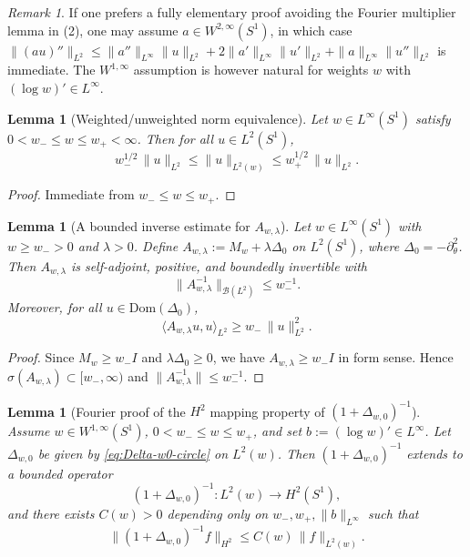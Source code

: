 \documentclass{amsart}
\numberwithin{equation}{section}
\newtheorem{lemma}[theorem]{Lemma}
\theoremstyle{definition}
\theoremstyle{remark}
\newtheorem{remark}[theorem]{Remark}
\begin{document}
\begin{remark}
If one prefers a fully elementary proof avoiding the Fourier multiplier lemma in (2),
one may assume $a\in W^{2,\infty}(S^1)$, in which case
$\|(au)''\|_{L^2}\le \|a''\|_{L^\infty}\|u\|_{L^2}+2\|a'\|_{L^\infty}\|u'\|_{L^2}
+\|a\|_{L^\infty}\|u''\|_{L^2}$ is immediate.
The $W^{1,\infty}$ assumption is however natural for weights $w$ with
$(\log w)'\in L^\infty$.
\end{remark}

\begin{lemma}[Weighted/unweighted norm equivalence]\label{lem:norm-equivalence}
Let $w\in L^\infty(S^1)$ satisfy $0<w_-\le w\le w_+<\infty$.
Then for all $u\in L^2(S^1)$,
\[
w_-^{1/2}\,\|u\|_{L^2}\le \|u\|_{L^2(w)}\le w_+^{1/2}\,\|u\|_{L^2}.
\]
\end{lemma}

\begin{proof}
Immediate from $w_-\le w\le w_+$.
\end{proof}

\begin{lemma}[A bounded inverse estimate for $A_{w,\lambda}$]\label{lem:Awlambda-inv}
Let $w\in L^\infty(S^1)$ with $w\ge w_->0$ and $\lambda>0$.
Define $A_{w,\lambda}:=M_w+\lambda\Delta_0$ on $L^2(S^1)$, where $\Delta_0=-\partial_\theta^2$.
Then $A_{w,\lambda}$ is self-adjoint, positive, and boundedly invertible with
\[
\|A_{w,\lambda}^{-1}\|_{\mathcal B(L^2)}\le w_-^{-1}.
\]
Moreover, for all $u\in \mathrm{Dom}(\Delta_0)$,
\[
\langle A_{w,\lambda}u,u\rangle_{L^2}\ge w_-\,\|u\|_{L^2}^2.
\]
\end{lemma}

\begin{proof}
Since $M_w\ge w_-I$ and $\lambda\Delta_0\ge0$, we have $A_{w,\lambda}\ge w_-I$ in form sense.
Hence $\sigma(A_{w,\lambda})\subset [w_-,\infty)$ and
$\|A_{w,\lambda}^{-1}\|\le w_-^{-1}$.
\end{proof}

\begin{lemma}[Fourier proof of the $H^2$ mapping property of $(1+\Delta_{w,0})^{-1}$]
\label{lem:R0-L2-to-H2}
Assume $w\in W^{1,\infty}(S^1)$, $0<w_-\le w\le w_+$, and set $b:=(\log w)'\in L^\infty$.
Let $\Delta_{w,0}$ be given by \eqref{eq:Delta-w0-circle} on $L^2(w)$.
Then $(1+\Delta_{w,0})^{-1}$ extends to a bounded operator
\[
(1+\Delta_{w,0})^{-1}: L^2(w)\to H^2(S^1),
\]
and there exists $C(w)>0$ depending only on $w_-,w_+,\|b\|_{L^\infty}$ such that
\[
\|(1+\Delta_{w,0})^{-1}f\|_{H^2}\le C(w)\,\|f\|_{L^2(w)}.
\]
\end{lemma}
\end{document}
